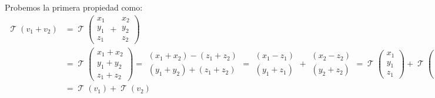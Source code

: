 \documentclass[12pt]{report}                                %
\DeclareMathOperator \LinealTransformation {\mathcal{T}}
\begin{document}
            Probemos la primera propiedad como:
            \begin{equation*}
            \begin{split}
                \LinealTransformation (v_1 + v_2) & =
                \LinealTransformation \left( \begin{matrix} x_1\\y_1\\z_1 \end{matrix} + \begin{matrix} x_2\\y_2\\z_2 \end{matrix} \right)
                \\
                & = \LinealTransformation \left( \begin{matrix} x_1+x_2\\y_1+y_2\\z_1+z_2 \end{matrix} \right)
                  = \begin{matrix} (x_1+x_2)-(z_1+z_2) \\ (y_1+y_2)+(z_1+z_2) \end{matrix}
                  = \begin{matrix}(x_1-z_1)\\(y_1+z_1)\end{matrix} + \begin{matrix}(x_2-z_2)\\(y_2+z_2)\end{matrix} 
                  = 
                  \LinealTransformation \left(\begin{matrix} x_1\\y_1\\z_1 \end{matrix} \right)
                  +
                  \LinealTransformation \left( \begin{matrix} x_2\\y_2\\z_2 \end{matrix} \right)            
                \\
                & = \LinealTransformation(v_1) + \LinealTransformation(v_2)
            \end{split}
            \end{equation*}
\end{document}
